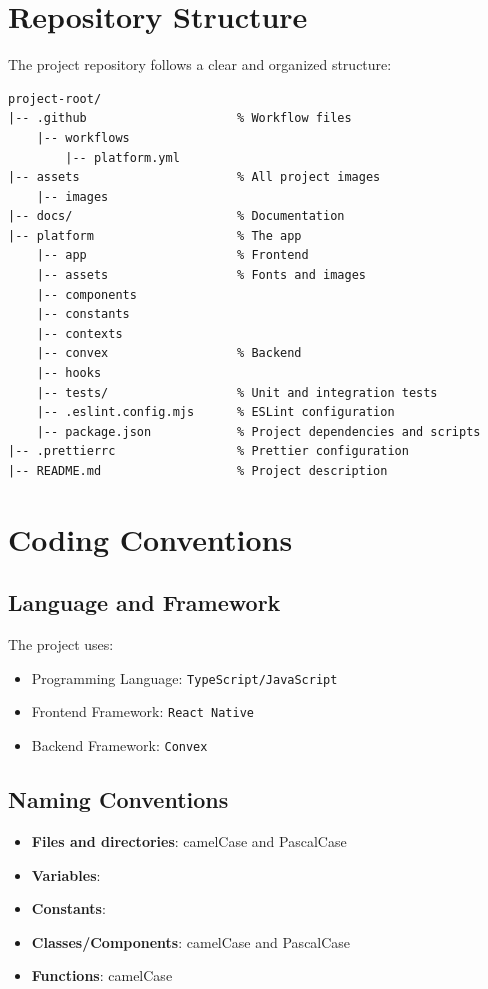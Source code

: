 \documentclass[a4paper,12pt]{article}
\begin{document}
\section{Repository Structure}
The project repository follows a clear and organized structure:

\begin{verbatim}
project-root/
|-- .github                     % Workflow files
    |-- workflows
        |-- platform.yml
|-- assets                      % All project images
    |-- images
|-- docs/                       % Documentation
|-- platform                    % The app
    |-- app                     % Frontend
    |-- assets                  % Fonts and images
    |-- components
    |-- constants
    |-- contexts
    |-- convex                  % Backend
    |-- hooks
    |-- tests/                  % Unit and integration tests
    |-- .eslint.config.mjs      % ESLint configuration
    |-- package.json            % Project dependencies and scripts
|-- .prettierrc                 % Prettier configuration
|-- README.md                   % Project description
\end{verbatim}

\section{Coding Conventions}

\subsection{Language and Framework}
The project uses:
\begin{itemize}
\item Programming Language: \texttt{TypeScript/JavaScript}
\item Frontend Framework: \texttt{React Native}
\item Backend Framework: \texttt{Convex}
\end{itemize}

\subsection{Naming Conventions}
\begin{itemize}
\item \textbf{Files and directories}: camelCase and PascalCase
\item \textbf{Variables}: 
\item \textbf{Constants}: 
\item \textbf{Classes/Components}: camelCase and PascalCase
\item \textbf{Functions}: camelCase
\end{itemize}
\end{document}
